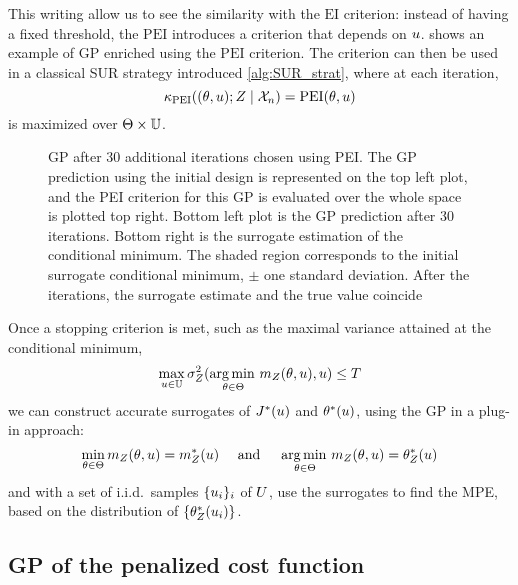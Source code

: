 \documentclass[../../Main_ManuscritThese.tex]{subfiles}
\newcommand\imgpath{/home/victor/acadwriting/Manuscrit/Text/Chapter4/img/}
\begin{document}
This writing allow us to see the similarity with the $\mathrm{EI}$ criterion: instead of having a fixed threshold, the $\mathrm{PEI}$ introduces a criterion that depends on $u$.  shows an example of GP enriched using the $\mathrm{PEI}$ criterion.
The criterion can then be used in a classical SUR strategy introduced \cref{alg:SUR_strat}, where at each iteration,
\begin{equation}
  \label{eq:PEI_criterion_SUR}
  \kappa_{\mathrm{PEI}}((\theta, u) ; Z \mid \mathcal{X}_n) = \mathrm{PEI}(\theta, u)
\end{equation}
is maximized over $\Theta \times \mathbb{U}$.
\begin{figure}[ht]
  \centering
  
  \caption[Illustration of enrichment using the PEI criterion]{\label{fig:example_PEI} GP after 30 additional iterations chosen using PEI. The GP prediction using the initial design is represented on the top left plot, and the PEI criterion for this GP is evaluated over the whole space is plotted top right. Bottom left plot is the GP prediction after 30 iterations. Bottom right is the surrogate estimation of the conditional minimum. The shaded region corresponds to the initial surrogate conditional minimum, $\pm$ one standard deviation. After the iterations, the surrogate estimate and the true value coincide}
\end{figure}
Once a stopping criterion is met, such as the maximal variance attained at the conditional minimum, 
\begin{equation}
  \max_{u\in\mathbb{U}} \sigma^2_Z(\operatorname*{arg\,min \,}_{\theta\in\Theta}m_Z(\theta,u), u) \leq T
\end{equation}
we can construct accurate surrogates of $J^*(u)$ and $\theta^*(u)$, using the GP in a plug-in approach:
\begin{equation}
  \min_{\theta\in\Theta} m_Z(\theta,u) = m^*_Z(u) \quad \text{ and } \quad \operatorname*{arg\,min \,}_{\theta\in\Theta} m_Z(\theta, u) = \theta_Z^*(u)
\end{equation}
and with a set of i.i.d.\ samples $\{u_i\}_i$ of $U$, use the surrogates to find the MPE, based on the distribution of $\{\theta_Z^*(u_i)\}$.


\subsection{GP of the penalized cost function}
\label{ssec:gp_delta_alpha}
\end{document}
